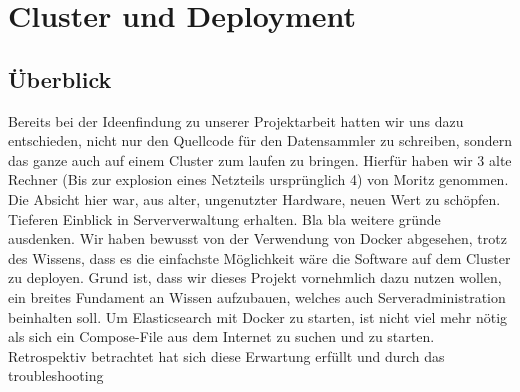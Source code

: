 \documentclass[12pt,oneside,a4paper,parskip]{scrbook}
\begin{document}
\chapter{Cluster und Deployment}
\section{Überblick} Bereits bei der Ideenfindung zu unserer Projektarbeit hatten wir uns dazu entschieden, nicht nur den Quellcode für den Datensammler zu schreiben, sondern das ganze auch auf einem Cluster zum laufen zu bringen. Hierfür haben wir 3 alte Rechner (Bis zur explosion eines Netzteils ursprünglich 4) von Moritz genommen. Die Absicht hier war, aus alter, ungenutzter Hardware, neuen Wert zu schöpfen. Tieferen Einblick in Serververwaltung erhalten. Bla bla weitere gründe ausdenken. Wir haben bewusst von der Verwendung von Docker abgesehen, trotz des Wissens, dass es die einfachste Möglichkeit wäre die Software auf dem Cluster zu deployen. Grund ist, dass wir dieses Projekt vornehmlich dazu nutzen wollen, ein breites Fundament an Wissen aufzubauen, welches auch Serveradministration beinhalten soll. Um Elasticsearch mit Docker zu starten, ist nicht viel mehr nötig als sich ein Compose-File aus dem Internet zu suchen und zu starten. Retrospektiv betrachtet hat sich diese Erwartung erfüllt und durch das troubleshooting
\end{document}
